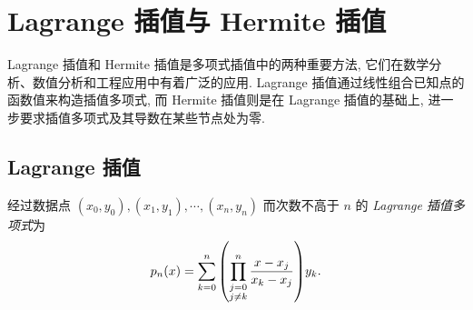 \section{Lagrange 插值与 Hermite 插值}

Lagrange 插值和 Hermite 插值是多项式插值中的两种重要方法, 它们在数学分析、数值分析和工程应用中有着广泛的应用. Lagrange 插值通过线性组合已知点的函数值来构造插值多项式, 而 Hermite 插值则是在 Lagrange 插值的基础上, 进一步要求插值多项式及其导数在某些节点处为零. 

\subsection{Lagrange 插值}

\begin{definition}
    经过数据点 $(x_0,y_0),(x_1,y_1),\cdots,(x_n,y_n)$ 而次数不高于 $n$ 的 \textit{Lagrange 插值多项式}为 $$p_n(x)=\sum_{k=0}^{n}\qty(\prod_{\substack{j=0\\j\neq k}}^{n}\dfrac{x-x_j}{x_k-x_j})y_k.$$
\end{definition}


